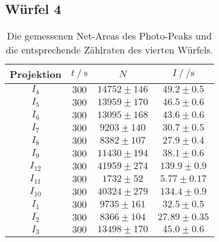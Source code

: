 \subsection{Würfel 4}


\begin{table}[H]
  \centering
  \begin{tabular}{c c c c}
    \toprule
    Projektion &  $t \:/\: \si{\second}$ &     $N$ &           $I \:/\: \si{\per\second}$ \\
    \midrule
        $I_{  4}$ &   $300$ & $14752 \pm     146$ & $  49.2\pm0.5$ \\
        $I_{  5}$ &   $300$ & $13959 \pm     170$ & $  46.5\pm0.6$ \\
        $I_{  6}$ &   $300$ & $13095 \pm     168$ & $  43.6\pm0.6$ \\
        $I_{  7}$ &   $300$ & $ 9203 \pm     140$ & $  30.7\pm0.5$ \\
        $I_{  8}$ &   $300$ & $ 8382 \pm     107$ & $  27.9\pm0.4$ \\
        $I_{  9}$ &   $300$ & $11430 \pm     194$ & $  38.1\pm0.6$ \\
        $I_{ 12}$ &   $300$ & $41959 \pm     274$ & $ 139.9\pm0.9$ \\
        $I_{ 11}$ &   $300$ & $ 1732 \pm      52$ & $  5.77\pm0.17$ \\
        $I_{ 10}$ &   $300$ & $40324 \pm     279$ & $ 134.4\pm0.9$ \\
        $I_{  1}$ &   $300$ & $ 9735 \pm     161$ & $  32.5\pm0.5$ \\
        $I_{  2}$ &   $300$ & $ 8366 \pm     104$ & $ 27.89\pm0.35$ \\
        $I_{  3}$ &   $300$ & $13498 \pm     170$ & $  45.0\pm0.6$ \\
      \bottomrule
  \end{tabular}
  \caption{Die gemessenen Net-Areas des Photo-Peaks und die entsprechende Zählraten des vierten Würfels. }
  \label{tab:w4}
\end{table}